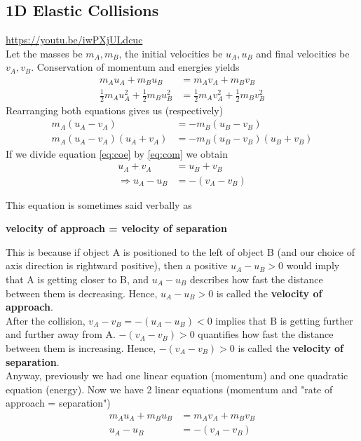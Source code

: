 \documentclass{article}
\begin{document}
\subsection{1D Elastic Collisions}
\url{https://youtu.be/iwPXjULdcuc}\\
Let the masses be $m_A, m_B$, the initial velocities be $u_A, u_B$ and final velocities be $v_A, v_B$. Conservation of momentum and energies yields
\begin{align}
    m_A u_A + m_B u_B &= m_A v_A + m_B v_B \\
    \frac{1}{2} m_A u_A^2 + \frac{1}{2} m_B u_B^2 &= \frac{1}{2} m_A v_A^2 + \frac{1}{2} m_B v_B^2 
\end{align}
Rearranging both equations gives us (respectively)
\begin{align}
    m_A (u_A - v_A) &= - m_B (u_B - v_B) \label{eq:com}\\
    m_A (u_A - v_A) (u_A + v_A) &= - m_B (u_B - v_B) (u_B + v_B) \label{eq:coe}
\end{align}
If we divide equation \ref{eq:coe} by \ref{eq:com} we obtain
\begin{align}
    u_A + v_A &= u_B + v_B \\
    \Rightarrow u_A - u_B &= - (v_A - v_B)
\end{align}
\begin{samepage}
This equation is sometimes said verbally as 
\begin{center}
    \textbf{velocity of approach = velocity of separation}
\end{center}
\end{samepage}
This is because if object A is positioned to the left of object B (and our choice of axis direction is rightward positive), then a positive $u_A - u_B > 0$ would imply that A is getting closer to B, and $u_A - u_B$ describes how fast the distance between them is decreasing. Hence, $u_A - u_B > 0$ is called the \textbf{velocity of approach}. \\[10pt]
After the collision, $v_A - v_B = -(u_A - u_B) < 0$ implies that B is getting further and further away from A. $-(v_A - v_B) > 0$ quantifies how fast the distance between them is increasing. Hence, $-(v_A - v_B) > 0$ is called the \textbf{velocity of separation}.\\[10pt]
Anyway, previously we had one linear equation (momentum) and one quadratic equation (energy). Now we have 2 linear equations (momentum and "rate of approach = separation")
\begin{align}
    m_A u_A + m_B u_B &= m_A v_A + m_B v_B \label{eq:com2}\\
    u_A - u_B &= - (v_A - v_B) \label{eq:voaevos}
\end{align}
\end{document}
